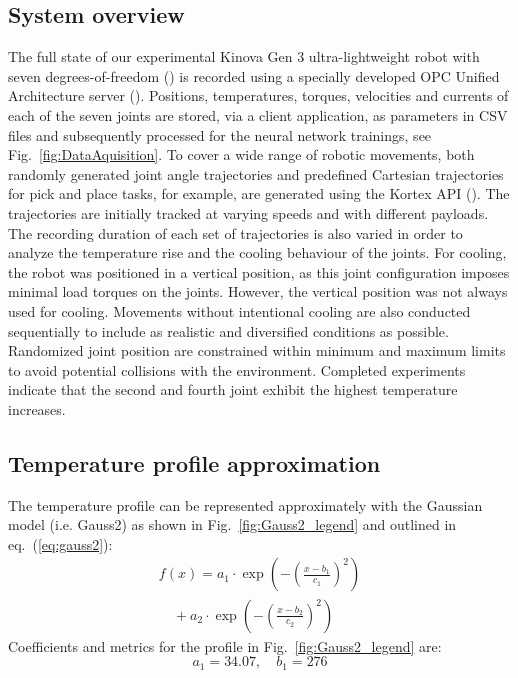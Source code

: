 \documentclass{ifacconf}
\begin{document}
\subsection{System overview}
The full state of our experimental Kinova Gen 3 ultra-lightweight robot with seven degrees-of-freedom (\cite{kinova}) is recorded using a specially developed OPC Unified Architecture server (\cite{Girke}). 
Positions, temperatures, torques, velocities and currents of each of the seven joints are stored, via a client application, as parameters in CSV files and subsequently processed for the neural network trainings, see Fig.~\ref{fig:DataAquisition}.
To cover a wide range of robotic movements, both randomly generated joint angle trajectories and predefined Cartesian trajectories for pick and place tasks, for example, are generated using the Kortex API (\cite{kortexAPI}). 
The trajectories are initially tracked at varying speeds and with different payloads. The recording duration of each set of trajectories is also varied in order to analyze the temperature rise and the cooling behaviour of the joints. 
For cooling, the robot was positioned in a vertical position, as this joint configuration imposes minimal load torques on the joints. However, the vertical position was not always used for cooling. Movements without intentional cooling are also conducted sequentially to include as realistic and diversified conditions as possible.
 Randomized joint position are constrained within minimum and maximum limits to avoid potential collisions with the environment. 
Completed experiments indicate that  the second and fourth joint exhibit the highest temperature increases. 

\subsection{Temperature profile approximation}
The temperature profile can be represented approximately with the Gaussian model (i.e. Gauss2) as shown in Fig.~\ref{fig:Gauss2_legend} and outlined in eq.~(\ref{eq:gauss2}):
\begin{equation} \label{eq:gauss2}
  \begin{array}{l}
  f(x) = a_1 \cdot \exp\left( -\left( \frac{x - b_1}{c_1} \right)^2 \right) \\
  \quad + a_2 \cdot \exp\left( -\left( \frac{x - b_2}{c_2} \right)^2 \right)
  \end{array}
  \end{equation}
Coefficients and metrics for the  profile in Fig.~\ref{fig:Gauss2_legend} are:
\[
a_1 = 34.07, \quad b_1 = 276 
\]
\end{document}
